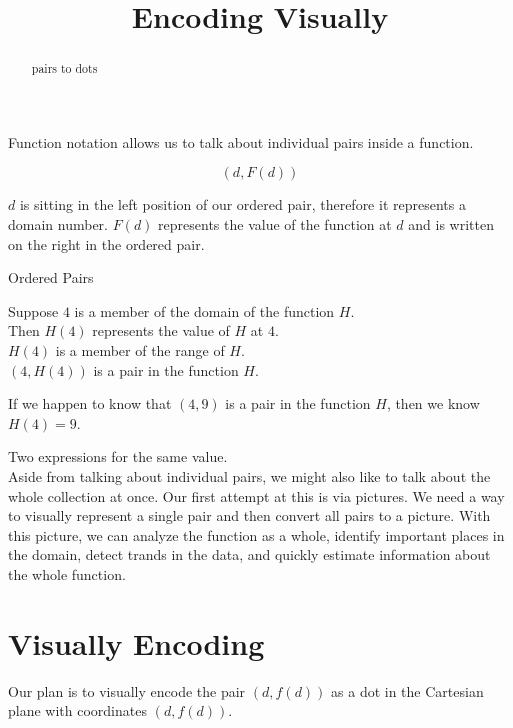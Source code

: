 \documentclass{ximera}
\title{Encoding Visually}
\begin{document}
\begin{abstract}
pairs to dots
\end{abstract}
\maketitle


Function notation allows us to talk about individual pairs inside a function.


\[
(d, F(d))
\]

$d$ is sitting in the left position of our ordered pair, therefore it represents a domain number. $F(d)$ represents the value of the function at $d$ and is written on the right in the ordered pair.


\begin{example} Ordered Pairs

Suppose $4$ is a member of the domain of the function $H$. \\
Then $H(4)$ represents the value of $H$ at $4$. \\
$H(4)$ is a member of the range of $H$. \\
$(4, H(4))$ is a pair in the function $H$.

If we happen to know that $(4, 9)$ is a pair in the function $H$, then we know $H(4) = 9$.

\end{example}
Two expressions for the same value. \\


Aside from talking about individual pairs, we might also like to talk about the whole collection at once.  Our first attempt at this is via pictures. We need a way to visually represent a single pair and then convert all pairs to a picture.  With this picture, we can analyze the function as a whole, identify important places in the domain, detect trands in the data, and quickly estimate information about the whole function.














\section{Visually Encoding}

Our plan is to visually encode the pair $(d,f(d))$ as a dot in the Cartesian plane with coordinates $(d,f(d))$.
\end{document}
